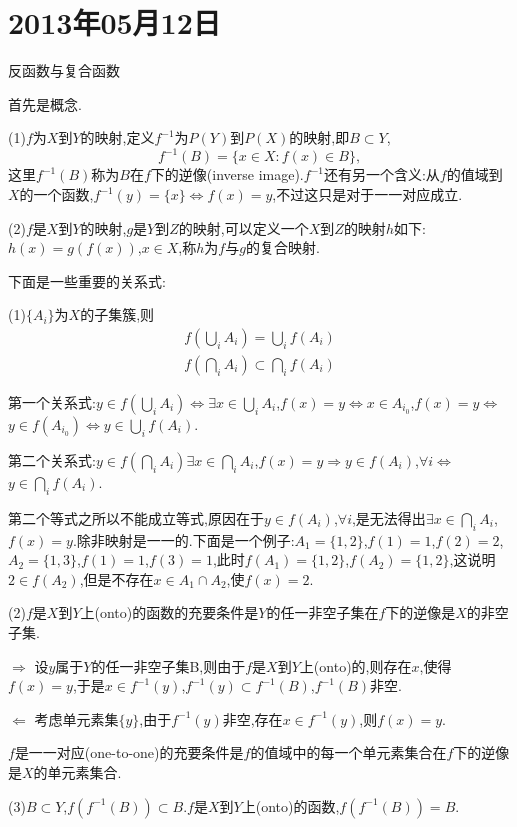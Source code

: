 \documentclass[12pt,a4paper,openany]{book}
\begin{document}
\section{2013年05月12日}
反函数与复合函数

首先是概念.

(1)$f$为$X$到$Y$的映射,定义$f^{-1}$为$P(Y)$到$P(X)$的映射,即$B \subset Y$,
\[
f^{-1}(B) = \{x \in X:f(x) \in B\},
\]
这里$f^{-1}(B)$称为$B$在$f$下的逆像(inverse image).$f^{-1}$还有另一个含义:从$f$的值域到$X$的一个函数,$f^{-1}(y)=\{x\}$$\Leftrightarrow$$f(x)=y$,不过这只是对于一一对应成立.

(2)$f$是$X$到$Y$的映射,$g$是$Y$到$Z$的映射,可以定义一个$X$到$Z$的映射$h$如下:$h(x)=g(f(x))$,$x \in X$,称$h$为$f$与$g$的复合映射.

下面是一些重要的关系式:

(1)$\{A_i\}$为$X$的子集簇,则
\begin{gather*}
f(\bigcup_{i}{A_i}) = \bigcup_{i}{f(A_i)} \\
f(\bigcap_{i}{A_i}) \subset \bigcap_{i}{f(A_i)}
\end{gather*}

第一个关系式:$y \in f(\bigcup_{i}{A_i})$$\Leftrightarrow$$\exists x \in \bigcup_{i}{A_i}$,$f(x)=y$$\Leftrightarrow$$x \in A_{i_0}$,$f(x)=y$$\Leftrightarrow$$y \in f(A_{i_0})$$\Leftrightarrow$$y \in \bigcup_{i}{f(A_i)}$.

第二个关系式:$y \in f(\bigcap_{i}{A_i})$$\exists x \in \bigcap_{i}{A_i}$,$f(x)=y$$\Rightarrow$$y \in f(A_i)$,$\forall i$$\Leftrightarrow$$y \in \bigcap_{i}{f(A_i)}$.

第二个等式之所以不能成立等式,原因在于$y \in f(A_i)$,$\forall i$,是无法得出$\exists x \in \bigcap_{i}{A_i}$,$f(x)=y$.除非映射是一一的.下面是一个例子:$A_1=\{1,2\}$,$f(1)=1$,$f(2)=2$,$A_2=\{1,3\}$,$f(1)=1$,$f(3)=1$,此时$f(A_1)=\{1,2\}$,$f(A_2)=\{1,2\}$,这说明$2 \in f(A_2)$,但是不存在$x \in A_1 \cap A_2$,使$f(x)=2$.

(2)$f$是$X$到$Y$上(onto)的函数的充要条件是$Y$的任一非空子集在$f$下的逆像是$X$的非空子集.

$\Rightarrow$ 设$y$属于$Y$的任一非空子集B,则由于$f$是$X$到$Y$上(onto)的,则存在$x$,使得$f(x)=y$,于是$x \in f^{-1}(y)$,$f^{-1}(y) \subset f^{-1}(B)$,$f^{-1}(B)$非空.

$\Leftarrow$ 考虑单元素集$\{y\}$,由于$f^{-1}(y)$非空,存在$x \in f^{-1}(y)$,则$f(x)=y$.

$f$是一一对应(one-to-one)的充要条件是$f$的值域中的每一个单元素集合在$f$下的逆像是$X$的单元素集合.

(3)$B \subset Y$,$f(f^{-1}(B)) \subset B$.$f$是$X$到$Y$上(onto)的函数,$f(f^{-1}(B))=B$.
\end{document}
